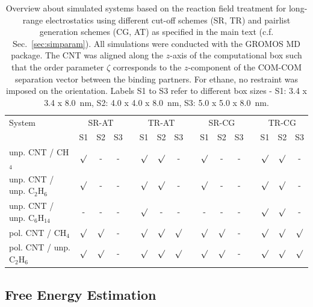 \documentclass[9pt,lessons]{livecoms}
\begin{document}
\begin{table}[ht]
\caption{\label{tbl:overview_RF}
Overview about simulated systems based on the reaction field treatment for long-range electrostatics using different cut-off schemes (SR, TR) and pairlist generation schemes (CG, AT) as 
specified in the main text (c.f. Sec.~\ref{sec:simparam}). 
All simulations were conducted with the GROMOS MD package. 
The CNT was aligned along the $z$-axis of the computational box such that the order parameter $\zeta$ corresponds to the $z$-component of the COM-COM separation vector 
between the binding partners. For ethane, no restraint was imposed on the orientation. 
Labels S1 to S3 refer to different box sizes - S1: 3.4 x 3.4 x 8.0~nm, S2: 4.0 x 4.0 x 8.0~nm, S3: 5.0 x 5.0 x 8.0~nm.
}
\centering
\begin{tabular}{l ccc c ccc c ccc c ccc}\hline
System & \multicolumn{3}{c}{SR-AT} & & \multicolumn{3}{c}{TR-AT} & & \multicolumn{3}{c}{SR-CG} & & \multicolumn{3}{c}{TR-CG}\\
\cline{2-4} \cline{6-8} \cline{10-12} \cline{14-16}
& S1 & S2 & S3 && S1 & S2 &  S3 && S1 & S2 & S3 && S1 & S2 & S3\\
\hline
unp. CNT / CH$_4$  & $\surd$ & - & - && $\surd$ & $\surd$ & - && $\surd$ & - & - &&  $\surd$ & $\surd$ & -\\
unp. CNT / unp. C$_2$H$_6$ & $\surd$ & - & - && $\surd$ & $\surd$ & - && $\surd$ & - & - &&  $\surd$ & $\surd$ & -\\
unp. CNT / unp. C$_6$H$_{14}$ & - & - & - && $\surd$ & - & - && - & - & - &&  $\surd$ & $\surd$ & -\\
\hline
pol. CNT / CH$_4$ & $\surd$ & $\surd$ & - && $\surd$ & $\surd$ & $\surd$ && $\surd$ & $\surd$ & - &&  $\surd$ & $\surd$ & $\surd$\\
pol. CNT / unp. C$_2$H$_6$ & $\surd$ & $\surd$ & - && $\surd$ & $\surd$ & $\surd$ && $\surd$ & $\surd$ & - &&  $\surd$ & $\surd$ & $\surd$\\
\hline
\end{tabular}
\end{table}


\subsection{Free Energy Estimation}
\label{sec:estimators}
\end{document}
